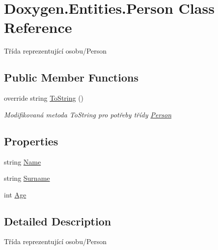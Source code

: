 \hypertarget{class_doxygen_1_1_entities_1_1_person}{\section{Doxygen.\+Entities.\+Person Class Reference}
\label{class_doxygen_1_1_entities_1_1_person}
}


Třída reprezentující osobu/\+Person  


\subsection*{Public Member Functions}
\begin{DoxyCompactItemize}
\item 
override string \hyperlink{class_doxygen_1_1_entities_1_1_person_a75ee31790fe0781f5454b8f3abf68a08}{To\+String} ()
\begin{DoxyCompactList}\small\item\em Modifikovaná metoda To\+String pro potřeby třídy \hyperlink{class_doxygen_1_1_entities_1_1_person}{Person} \end{DoxyCompactList}\end{DoxyCompactItemize}
\subsection*{Properties}
\begin{DoxyCompactItemize}
\item 
string \hyperlink{class_doxygen_1_1_entities_1_1_person_abe1c1357f677dd55a4b2aa2c42d3ca41}{Name}
\item 
string \hyperlink{class_doxygen_1_1_entities_1_1_person_a60a3fd51dedab2d55857a21f5ecdb6f4}{Surname}
\item 
int \hyperlink{class_doxygen_1_1_entities_1_1_person_a9f8599c630b0e103bfd1081e9c9aa888}{Age}
\end{DoxyCompactItemize}


\subsection{Detailed Description}
Třída reprezentující osobu/\+Person 




